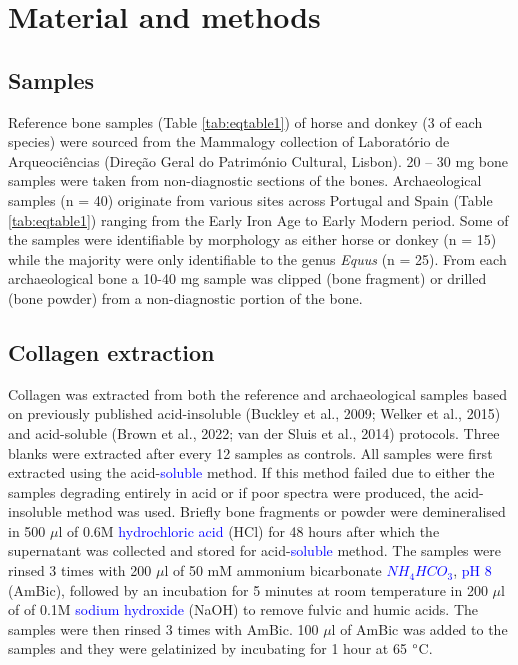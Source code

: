 \documentclass[preprint, 3p, authoryear]{elsarticle} %
\begin{document}
\hypertarget{material-and-methods}{%
\section{Material and methods}\label{material-and-methods}}

\hypertarget{samples}{%
\subsection{Samples}\label{samples}}

Reference bone samples (Table \ref{tab:eqtable1}) of horse and donkey (3 of each species) were sourced from the Mammalogy collection of Laboratório de Arqueociências (Direção Geral do Património Cultural, Lisbon). 20 -- 30 mg bone samples were taken from non-diagnostic sections of the bones. Archaeological samples (n = 40) originate from various sites across Portugal and Spain (Table \ref{tab:eqtable1}) ranging from the Early Iron Age to Early Modern period. Some of the samples were identifiable by morphology as either horse or donkey (n = 15) while the majority were only identifiable to the genus \emph{Equus} (n = 25). From each archaeological bone a 10-40 mg sample was clipped (bone fragment) or drilled (bone powder) from a non-diagnostic portion of the bone.

\hypertarget{collagen-extraction}{%
\subsection{Collagen extraction}\label{collagen-extraction}}

Collagen was extracted from both the reference and archaeological samples based on previously published acid-insoluble (Buckley et al., 2009; Welker et al., 2015) and acid-soluble (Brown et al., 2022; van der Sluis et al., 2014) protocols. Three blanks were extracted after every 12 samples as controls. All samples were first extracted using the acid-\textcolor{blue}{soluble} method. If this method failed due to either the samples degrading entirely in acid or if poor spectra were produced, the acid-insoluble method was used. Briefly bone fragments or powder were demineralised in 500 \(\mu\)l of 0.6M \textcolor{blue}{hydrochloric acid} (HCl) for 48 hours after which the supernatant was collected and stored for acid-\textcolor{blue}{soluble} method. The samples were rinsed 3 times with 200 \(\mu\)l of 50 mM ammonium bicarbonate \textcolor{blue}{$NH_{4}HCO_{3}$}, \textcolor{blue}{pH 8} (AmBic), followed by an incubation for 5 minutes at room temperature in 200 \(\mu\)l of of 0.1M \textcolor{blue}{sodium hydroxide} (NaOH) to remove fulvic and humic acids. The samples were then rinsed 3 times with AmBic. 100 \(\mu\)l of AmBic was added to the samples and they were gelatinized by incubating for 1 hour at 65 \(\text{\textdegree}\)C.
\end{document}
